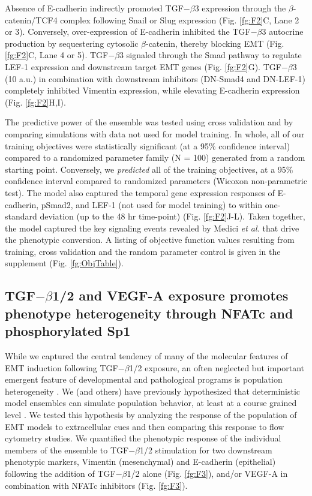 \documentclass[11pt,letterpaper]{article}
\begin{document}
Absence of E-cadherin indirectly promoted TGF$-\beta$3 expression through the $\beta$-catenin/TCF4 complex following Snail or Slug expression (Fig. \ref{fg:F2}C, Lane 2 or 3).
Conversely, over-expression of E-cadherin inhibited the TGF$-\beta$3 autocrine production by sequestering cytosolic $\beta$-catenin, thereby blocking EMT (Fig. \ref{fg:F2}C, Lane 4 or 5).
TGF$-\beta$3 signaled through the Smad pathway to regulate LEF-1 expression and downstream target EMT genes (Fig. \ref{fg:F2}G).
TGF$-\beta$3 (10 a.u.) in combination with downstream inhibitors (DN-Smad4 and DN-LEF-1) completely inhibited Vimentin expression, while elevating E-cadherin expression (Fig. \ref{fg:F2}H,I).

The predictive power of the ensemble was tested using cross validation and by comparing simulations with data not used for model training.
In whole, all of our training objectives were statistically significant (at a 95\% confidence interval) compared to a randomized parameter family (N = 100)
generated from a random starting point. Conversely, we \emph{predicted} all of the training objectives, at a 95\% confidence interval compared to randomized parameters (Wicoxon non-parametric test). The model also captured the temporal gene expression responses of E-cadherin, pSmad2, and LEF-1 (not used for model training) to within one-standard deviation (up to the 48 hr time-point) (Fig. \ref{fg:F2}J-L). Taken together, the model captured the key signaling events revealed by Medici \emph{et al.} \cite{Medici:2008fk} that drive the phenotypic conversion. A listing of objective function values resulting from training, cross validation and the random parameter control is given in the supplement (Fig. \ref{fg:ObjTable}).

\subsection*{TGF$-\beta$1/2 and VEGF-A exposure promotes phenotype heterogeneity through NFATc and phosphorylated Sp1}
While we captured the central tendency of many of the molecular features of EMT induction following TGF$-\beta$1/2 exposure, an often neglected but important emergent
feature of developmental and pathological programs is population heterogeneity \cite{Park:2010fu}.
We (and others) have previously hypothesized that deterministic model ensembles can simulate population behavior, at least at a course grained level \cite{Lequieu:2011fj}.
We tested this hypothesis by analyzing the response of the population of EMT models to extracellular cues and then comparing this response to flow cytometry studies.
We quantified the phenotypic response of the individual members of the ensemble to TGF$-\beta$1/2 stimulation for two downstream phenotypic markers, Vimentin (mesenchymal) and E-cadherin (epithelial) following the addition of TGF$-\beta$1/2 alone (Fig. \ref{fg:F3}), and/or VEGF-A in combination with NFATc inhibitors (Fig. \ref{fg:F3}).
\end{document}
